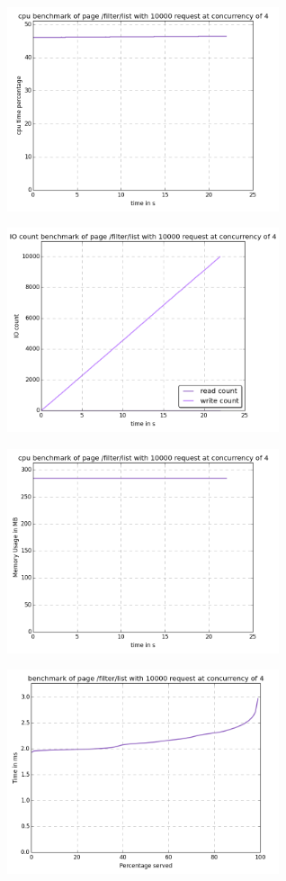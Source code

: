 \begin{center}
\includegraphics[width=0.6\textwidth]{img/filter.list.cpu.png}



\includegraphics[width=0.6\textwidth]{img/filter.list.io-count.png}



\includegraphics[width=0.6\textwidth]{img/filter.list.mem.png}



\includegraphics[width=0.6\textwidth]{img/filter.list.serv-time.png}




\end{center}
